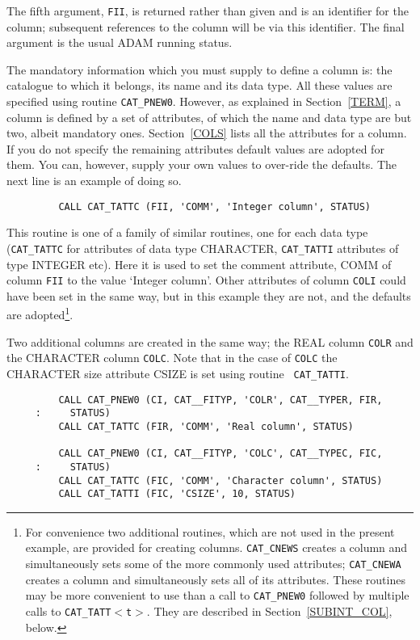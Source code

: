 The fifth argument, {\tt FII}, is returned rather than given and is an
identifier for the column; subsequent references to the column will be
via this identifier. The final argument is the usual ADAM running
status.

The mandatory information which you must supply to define a column is:
the catalogue to which it belongs, its name and its data type. All these
values are specified using routine {\tt CAT\_PNEW0}. However, as
explained in Section~\ref{TERM}, a column is defined by a set of
attributes, of which the name and data type are but two, albeit
mandatory ones. Section~\ref{COLS} lists all the attributes for a
column. If you do not specify the remaining attributes default
values are adopted for them. You can, however, supply your own values to
over-ride the defaults. The next line is an example of doing so.

\begin{verbatim}
         CALL CAT_TATTC (FII, 'COMM', 'Integer column', STATUS)
\end{verbatim}

This routine is one of a family of similar routines, one for each
data type ({\tt CAT\_TATTC} for attributes of data type CHARACTER,
{\tt CAT\_TATTI} attributes of type INTEGER etc). Here it is used
to set the comment attribute, COMM of column {\tt FII} to the
value `Integer column'. Other attributes of column {\tt COLI} could have
been set in the same way, but in this example they are not, and the
defaults are adopted\footnote{For convenience two additional routines,
which are not used in the present example, are provided for creating
columns. {\tt CAT\_CNEWS} creates a column and simultaneously sets some
of the more commonly used attributes; {\tt CAT\_CNEWA} creates a column
and simultaneously sets all of its attributes. These routines may be
more convenient to use than a call to {\tt CAT\_PNEW0} followed by
multiple calls to {\tt CAT\_TATT$<$t$>$}. They are described in
Section~\ref{SUBINT_COL}, below.}.

Two additional columns are created in the same way; the REAL column
{\tt COLR} and the CHARACTER column {\tt COLC}. Note that in the case of
{\tt COLC} the CHARACTER size attribute CSIZE is set using routine {\tt
CAT\_TATTI}.

\begin{verbatim}
         CALL CAT_PNEW0 (CI, CAT__FITYP, 'COLR', CAT__TYPER, FIR,
     :     STATUS)
         CALL CAT_TATTC (FIR, 'COMM', 'Real column', STATUS)

         CALL CAT_PNEW0 (CI, CAT__FITYP, 'COLC', CAT__TYPEC, FIC,
     :     STATUS)
         CALL CAT_TATTC (FIC, 'COMM', 'Character column', STATUS)
         CALL CAT_TATTI (FIC, 'CSIZE', 10, STATUS)
\end{verbatim}

